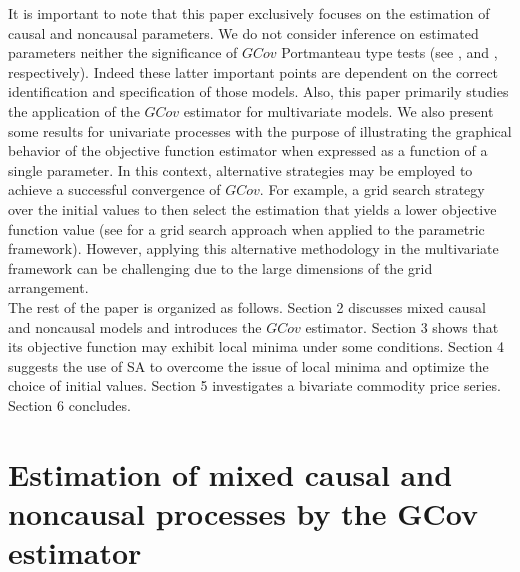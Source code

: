 \documentclass[<1p>]{elsarticle} %
\begin{document}
\indent It is important to note that this paper exclusively focuses on the estimation of causal and noncausal parameters. We do not consider inference on estimated parameters neither the significance of $GCov$ Portmanteau type tests (see \cite{gourieroux2022generalized}, and \cite{jasiakneyazi}, respectively). Indeed these latter important points are dependent on the correct identification and specification of those models. Also, this paper primarily studies the application of the $GCov$ estimator for multivariate models. We also present some results for univariate processes with the purpose of illustrating the graphical behavior of the objective function estimator when expressed as a function of a single parameter. In this context, alternative strategies may be employed to achieve a successful convergence of $GCov$. For example, a grid search strategy over the initial values to then select the estimation that yields a lower objective function value (see \cite{bec2020mixed} for a grid search approach when applied to the parametric framework). However, applying this alternative methodology in the multivariate framework can be challenging due to the large dimensions of the grid arrangement.\\
\indent The rest of the paper is organized as follows. Section 2 discusses mixed causal and noncausal models and introduces the $GCov$ estimator. Section 3 shows that its objective function may exhibit local minima under some conditions. Section 4 suggests the use of SA to overcome the issue of local minima and optimize the choice of initial values. Section 5 investigates a bivariate commodity price series. Section 6 concludes.

\section{\textbf{Estimation of mixed causal and noncausal processes by the GCov estimator}}
\end{document}
